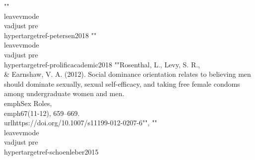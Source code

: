 {{{{{{{{{{{{{{{{{{{{{{{{{{{{""\\leavevmode\\vadjust pre{\\hypertarget{ref-petersen2018}{}}%
""\\leavevmode\\vadjust pre{\\hypertarget{ref-prolificacademic2018}{}}%
""Rosenthal, L., Levy, S. R., \\& Earnshaw, V. A. (2012). Social dominance orientation relates to believing men should dominate sexually, sexual self-efficacy, and taking free female condoms among undergraduate women and men. \\emph{Sex Roles}, \\emph{67}(11-12), 659--669. \\url{https://doi.org/10.1007/s11199-012-0207-6}"", ""\\leavevmode\\vadjust pre{\\hypertarget{ref-schoenleber2015}{}}%
}}}}}}}}}}}}}}}}}}}}}}}}}}}}

